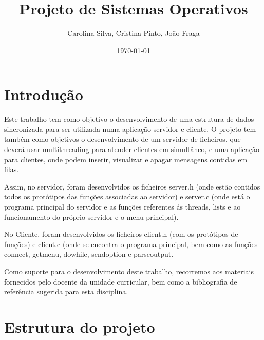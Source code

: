 \documentclass{article}
\author{Carolina Silva, Cristina Pinto, João Fraga}
\date{\today}
\title{Projeto de Sistemas Operativos}
\begin{document}
\maketitle
\maketitle

\pagebreak{}
\tableofcontents
\listoffigures
\listoftables

\pagebreak{}
\section{Introdução}
\label{sec:org5d4b4bd}

Este trabalho \cite{enunciado} tem como objetivo o desenvolvimento de uma estrutura de dados sincronizada para ser utilizada numa aplicação servidor e cliente.
O projeto \cite{enunciado} tem também como objetivos o desenvolvimento de um servidor de ficheiros, que deverá usar multithreading para atender clientes em simultâneo, e uma aplicação para clientes, onde podem inserir, visualizar e apagar mensagens contidas em filas.

Assim, no servidor, foram desenvolvidos os ficheiros server.h (onde estão contidos todos os protótipos das funções associadas ao servidor) e server.c (onde está o programa principal do servidor e as funções referentes ás threads, lists e ao funcionamento do próprio servidor e o menu principal).

No Cliente,  foram desenvolvidos os ficheiros client.h (com os protótipos de funções) e client.c (onde se encontra o programa principal, bem como as funções connect, getmenu, dowhile, sendoption e parseoutput.

Como suporte para o desenvolvimento deste trabalho, recorremos aos materiais fornecidos pelo docente da unidade curricular, bem como a bibliografia de referência sugerida para esta disciplina.

\pagebreak{}
\section{Estrutura do projeto}
\label{sec:org602821f}
\end{document}
